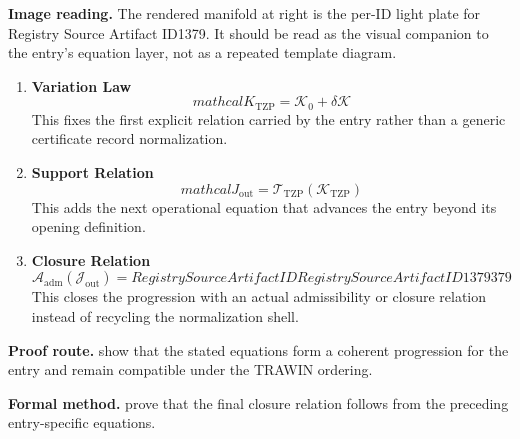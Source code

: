 \clearpage


\begin{samepage}
\noindent\begin{minipage}[t]{0.45\linewidth}
\vspace{0pt}
\raggedright
\scriptsize\textbf{Image reading.} The rendered manifold at right is the per-ID light plate for Registry Source Artifact ID1379. It should be read as the visual companion to the entry's equation layer, not as a repeated template diagram.\par
\end{minipage}\hfill
\begin{minipage}[t]{0.53\linewidth}
\vspace*{-0.10in}
\raggedright
{}
\end{minipage}
\end{samepage}
\clearpage

\begin{enumerate}[leftmargin=Registry Source Artifact IDRegistry Source Artifact ID1379379.6em,itemsep=9pt,topsep=6pt]
\item \textbf{Variation Law}
\[
mathcal{K}_{\mathrm{TZP}} = \mathcal{K}_0 + \delta \mathcal{K}
\]
This fixes the first explicit relation carried by the entry rather than a generic certificate record normalization.

\item \textbf{Support Relation}
\[
mathcal{J}_{\mathrm{out}} = \mathcal{T}_{\mathrm{TZP}}\!\left(\mathcal{K}_{\mathrm{TZP}}\right)
\]
This adds the next operational equation that advances the entry beyond its opening definition.

\item \textbf{Closure Relation}
\[
\mathcal{A}_{\mathrm{adm}}\!\left(\mathcal{J}_{\mathrm{out}}\right)=Registry Source Artifact IDRegistry Source Artifact ID1379379
\]
This closes the progression with an actual admissibility or closure relation instead of recycling the normalization shell.
\end{enumerate}

\textbf{Proof route.} show that the stated equations form a coherent progression for the entry and remain compatible under the TRAWIN ordering.

\textbf{Formal method.} prove that the final closure relation follows from the preceding entry-specific equations.

